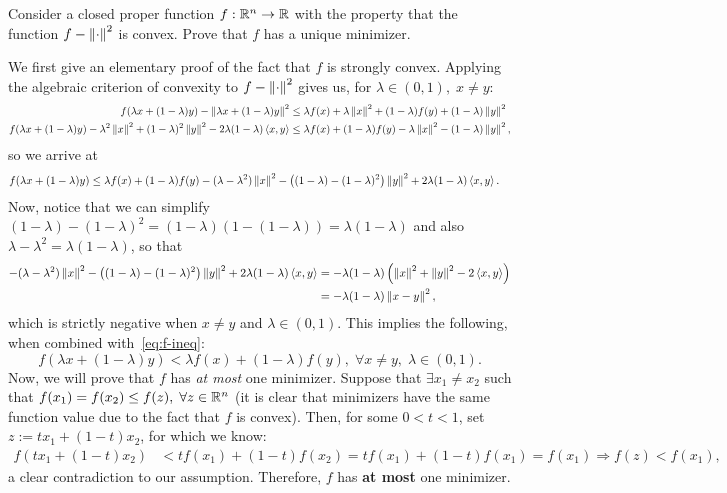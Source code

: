 \documentclass[10pt]{article}
\begin{document}
\begin{Exercise}
	Consider a closed proper function $f: \mathbb{R}^n \to \mathbb{R}$ with the property
	that the function $f - \left \| \cdot \right \|^2$ is convex. Prove that $f$ has a
	unique minimizer.
\end{Exercise}
\begin{Answer}
	We first give an elementary proof of the fact that $f$ is strongly convex.
	Applying the algebraic criterion of convexity to $f - \left \| \cdot \right \|^2$ gives
	us, for $\lambda \in (0, 1), \; x \neq y$:
	\begin{align*}
		f(\lambda x + (1 - \lambda) y) - \left \| \lambda x + (1 - \lambda) y \right \|^2
		&\leq \lambda f(x) + \lambda \left \| x \right \|^2 + (1 - \lambda) f(y) + (1 -
		\lambda) \left \| y \right \|^2 \nonumber \\
		f(\lambda x + (1 - \lambda) y) - \lambda^2 \left \| x \right \|^2 + (1 - \lambda)^2
		\left \| y \right \|^2 - 2 \lambda(1 - \lambda) \left\langle x, y \right\rangle &\leq
			\lambda f(x) + (1 - \lambda) f(y) - \lambda \left \| x \right \|^2 - (1 -
			\lambda) \left \| y \right \|^2,
	\end{align*}
	so we arrive at
	\begin{align}
		f(\lambda x + (1 - \lambda) y) &\leq
		\lambda f(x) + (1 - \lambda) f(y) - (\lambda - \lambda^2) \left \| x \right \|^2
		- \left( (1 - \lambda) - (1 - \lambda)^2 \right) \left \| y \right \|^2
		+ 2 \lambda (1 - \lambda) \left\langle x, y \right\rangle.
		\label{eq:f-ineq}
	\end{align}
	Now, notice that we can simplify $(1 - \lambda) - (1 - \lambda)^2 =
	(1 - \lambda)( 1 - (1 - \lambda)) = \lambda(1 - \lambda)$ and also $\lambda
	- \lambda^2 = \lambda(1 - \lambda)$, so that
	\begin{align*}
		-(\lambda - \lambda^2) \left \| x \right \|^2 - \left( (1 - \lambda) - (1 -
		\lambda)^2 \right) \left \| y \right \|^2 + 2 \lambda(1 - \lambda) \left\langle x, y \right\rangle &=
		-\lambda (1 - \lambda) \left(\left \| x \right \|^2 + \left \| y \right \|^2 - 2 \left\langle x,
		y \right\rangle\right) \\
			&= -\lambda(1 - \lambda) \left \| x - y \right \|^2,
	\end{align*}
	which is strictly negative when $x \neq y$ and $\lambda \in (0, 1)$. This
	implies the following, when combined with~\cref{eq:f-ineq}:
	\[
		f(\lambda x + (1 - \lambda) y) < \lambda f(x) +
		(1 - \lambda) f(y), \; \forall x \neq y, \; \lambda \in (0, 1).
	\]
	Now, we will prove that $f$ has \textit{at most} one minimizer. Suppose
	that $\exists x_1 \neq x_2$ such that $f(x_1) = f(x_2) \leq f(z), \;
	\forall z \in \mathbb{R}^n$ (it is clear that minimizers have the same function
	value due to the fact that $f$ is convex).
	Then, for some $0 < t < 1$, set $z := t x_1 + (1 - t) x_2$, for which we
	know:
	\begin{align*}
		f(t x_1 + (1 - t) x_2) & < t f(x_1) + (1 - t) f(x_2) = t f(x_1) + (1 - t)
		f(x_1) = f(x_1) \Rightarrow f(z) < f(x_1),
	\end{align*}
	a clear contradiction to our assumption. Therefore, $f$ has \textbf{at
	most} one minimizer.


\end{Answer}
\end{document}
